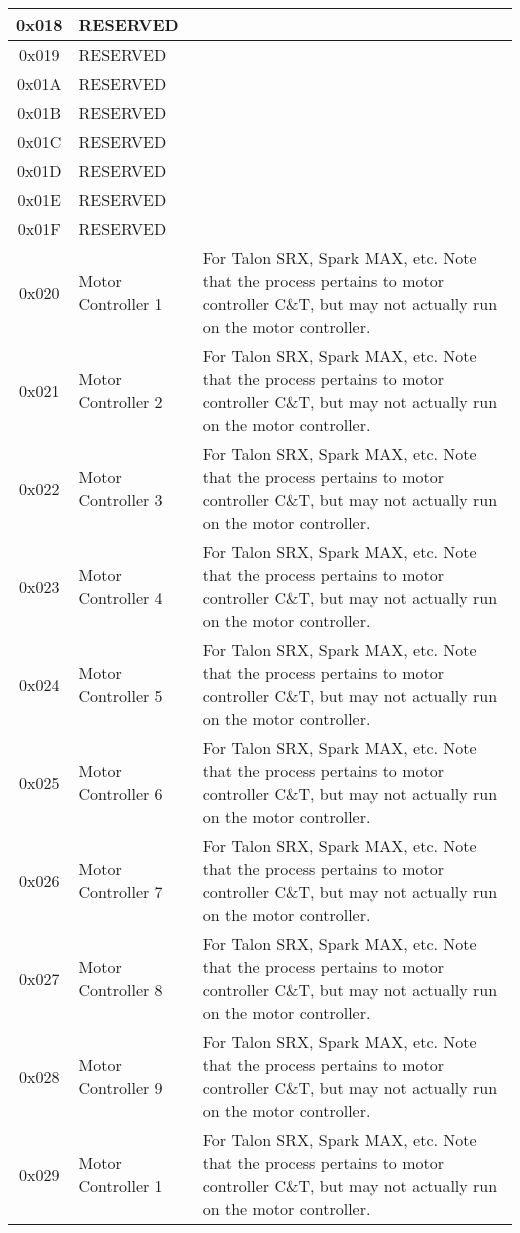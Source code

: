 \documentclass[12pt]{article}
\begin{document}
\begin{longtable}{|c|l|p{2in}|}
	0x018 & RESERVED &\\ \hline
	0x019 & RESERVED &\\ \hline
	0x01A & RESERVED &\\ \hline
	0x01B & RESERVED &\\ \hline
	0x01C & RESERVED &\\ \hline
	0x01D & RESERVED &\\ \hline
	0x01E & RESERVED &\\ \hline
	0x01F & RESERVED &\\ \hline
	0x020 & Motor Controller 1 & For Talon SRX, Spark MAX, etc. Note that the process pertains to motor controller C\&T, but may not actually run on the motor controller.\\ \hline
	0x021 & Motor Controller 2 & For Talon SRX, Spark MAX, etc. Note that the process pertains to motor controller C\&T, but may not actually run on the motor controller.\\ \hline
	0x022 & Motor Controller 3 & For Talon SRX, Spark MAX, etc. Note that the process pertains to motor controller C\&T, but may not actually run on the motor controller.\\ \hline
	0x023 & Motor Controller 4 & For Talon SRX, Spark MAX, etc. Note that the process pertains to motor controller C\&T, but may not actually run on the motor controller.\\ \hline
	0x024 & Motor Controller 5 & For Talon SRX, Spark MAX, etc. Note that the process pertains to motor controller C\&T, but may not actually run on the motor controller.\\ \hline
	0x025 & Motor Controller 6 & For Talon SRX, Spark MAX, etc. Note that the process pertains to motor controller C\&T, but may not actually run on the motor controller.\\ \hline
	0x026 & Motor Controller 7 & For Talon SRX, Spark MAX, etc. Note that the process pertains to motor controller C\&T, but may not actually run on the motor controller.\\ \hline
	0x027 & Motor Controller 8 & For Talon SRX, Spark MAX, etc. Note that the process pertains to motor controller C\&T, but may not actually run on the motor controller.\\ \hline
	0x028 & Motor Controller 9 & For Talon SRX, Spark MAX, etc. Note that the process pertains to motor controller C\&T, but may not actually run on the motor controller.\\ \hline
	0x029 & Motor Controller 1 & For Talon SRX, Spark MAX, etc. Note that the process pertains to motor controller C\&T, but may not actually run on the motor controller.\\ \hline

\end{longtable}
\end{document}
